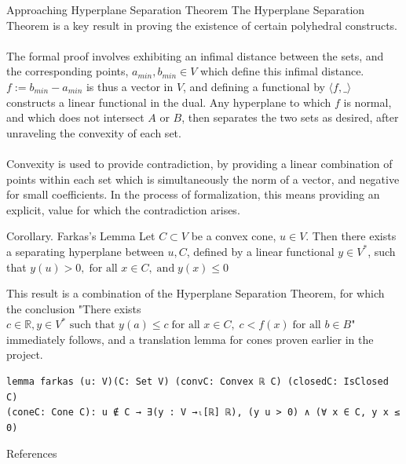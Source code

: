 \documentclass[final]{beamer}
\newlength{\colwidth}
\begin{document}
\begin{frame}[fragile]
\begin{columns}[t]
\begin{column}{\colwidth}
            \begin{block}{Approaching Hyperplane Separation Theorem}
                The Hyperplane Separation Theorem is a key result in proving the existence of certain polyhedral constructs.
                \\\\The formal proof involves exhibiting an infimal distance between the sets, and the corresponding points, $a_{min}, b_{min} \in V$ which define this infimal distance.
                $f:= b_{min}-a_{min}$ is thus a vector in $V$, and defining a functional by $\langle f, \_\rangle$ constructs a linear functional in the dual. Any hyperplane to which $f$
                is normal, and which does not intersect $A$ or $B$, then separates the two sets as desired, after unraveling the convexity of each set.
                \\\\Convexity is used to provide contradiction, by providing a linear combination of points within each set which is simultaneously the norm of a vector,
                and negative for small coefficients. In the process of formalization, this means providing an explicit, value for which the contradiction arises.         
            \end{block}
            
             
            \begin{exampleblock}{Corollary. Farkas's Lemma}
              Let $C \subset V$ be a convex cone, $u\in V$. Then there exists a separating hyperplane between $u, C$, defined by a linear functional $y \in V^*$, such that $
              y(u)> 0, \; \text{for all } x\in C, \; \text{and} \; y(x) \le 0
              $
            \end{exampleblock}
            This result is  a combination of the Hyperplane Separation Theorem, for which the conclusion "There exists $
              c\in \mathbb{R}, y \in V^* \text{ such that } y(a) \le c\; \text{for all } x\in C, \; c < f(x)\; \text{for all }  b\in B
            $" immediately follows, and a translation lemma for cones proven earlier in the project.
\begin{Verbatim}
lemma farkas (u: V)(C: Set V) (convC: Convex ℝ C) (closedC: IsClosed C)
(coneC: Cone C): u ∉ C → ∃(y : V →ₗ[ℝ] ℝ), (y u > 0) ∧ (∀ x ∈ C, y x ≤ 0)
\end{Verbatim}  
           
            
        \begin{block}{References}
        \nocite{liunotes}
        \begin{bibdiv}
        \begin{biblist}
        \end{biblist}
        \end{bibdiv}
        \end{block}
\end{column}


\end{columns}
\end{frame}
\end{document}
